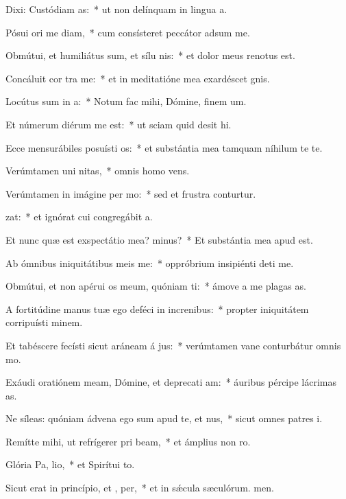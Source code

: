 \item Dixi: Custódiam  as:~* ut non delínquam in lingua a.
\item Pósui ori me diam,~* cum consísteret peccátor adsum me.
\item Obmútui, et humiliátus sum, et sílu  nis:~* et dolor meus renotus est.
\item Concáluit cor  tra me:~* et in meditatióne mea exardéscet gnis.
\item Locútus sum in  a:~* Notum fac mihi, Dómine, finem um.
\item Et númerum diérum me  est:~* ut sciam quid desit hi.
\item Ecce mensurábiles posuísti  os:~* et substántia mea tamquam níhilum te te.
\item Verúmtamen uni nitas,~* omnis homo vens.
\item Verúmtamen in imágine per mo:~* sed et frustra conturtur.
\item {}zat:~* et ignórat cui congregábit a.
\item Et nunc quæ est exspectátio mea?  minus?~* Et substántia mea apud  est.
\item Ab ómnibus iniquitátibus meis  me:~* oppróbrium insipiénti deti me.
\item Obmútui, et non apérui os meum, quóniam  ti:~* ámove a me plagas as.
\item A fortitúdine manus tuæ ego deféci in increnibus:~* propter iniquitátem corripuísti minem.
\item Et tabéscere fecísti sicut aráneam á jus:~* verúmtamen vane conturbátur omnis mo.
\item Exáudi oratiónem meam, Dómine, et deprecati am:~* áuribus pércipe lácrimas as.
\item Ne síleas: quóniam ádvena ego sum apud te, et nus,~* sicut omnes patres i.
\item Remítte mihi, ut refrígerer pri beam,~* et ámplius non ro.
\item Glória Pa,  lio,~* et Spirítui to.
\item Sicut erat in princípio, et ,  per,~* et in sǽcula sæculórum. men.
